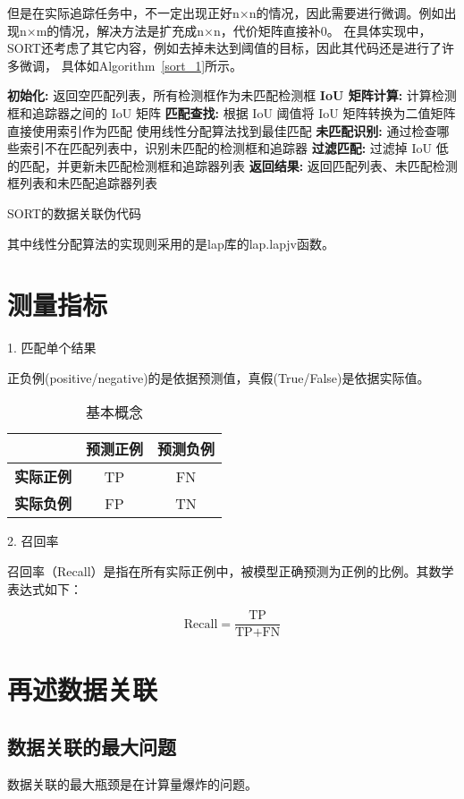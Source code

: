 但是在实际追踪任务中，不一定出现正好n×n的情况，因此需要进行微调。例如出现n×m的情况，解决方法是扩充成n×n，代价矩阵直接补0。
在具体实现中，SORT还考虑了其它内容，例如去掉未达到阈值的目标，因此其代码还是进行了许多微调，
具体如Algorithm\ \ref{sort_1}所示。

\begin{algorithm}
	\begin{algorithmic}
		\State \textbf{初始化:}
		\State 返回空匹配列表，所有检测框作为未匹配检测框
		\EndIf
		\State \textbf{IoU 矩阵计算:}
		\State 计算检测框和追踪器之间的 IoU 矩阵
		\State \textbf{匹配查找:}
		\State 根据 IoU 阈值将 IoU 矩阵转换为二值矩阵
		\State 直接使用索引作为匹配
		\Else
		\State 使用线性分配算法找到最佳匹配
		\EndIf
		\State \textbf{未匹配识别:}
		\State 通过检查哪些索引不在匹配列表中，识别未匹配的检测框和追踪器
		\State \textbf{过滤匹配:}
		\State 过滤掉 IoU 低的匹配，并更新未匹配检测框和追踪器列表
		\State \textbf{返回结果:}
		\State 返回匹配列表、未匹配检测框列表和未匹配追踪器列表
	\end{algorithmic}
	\caption{SORT的数据关联伪代码}
	\label{sort_1}
\end{algorithm}

其中线性分配算法的实现则采用的是lap库的lap.lapjv函数。

\chapter{测量指标}
1. 匹配单个结果

正负例(positive/negative)的是依据预测值，真假(True/False)是依据实际值。

\begin{table}[h!]
	\centering
	\caption{基本概念}
	\label{tab:confusion_matrix}
	\begin{tabular}{l c c}
		\toprule
		& \textbf{预测正例} & \textbf{预测负例} \\
		\midrule
		\textbf{实际正例} & TP & FN \\
		\textbf{实际负例} & FP & TN \\
		\bottomrule
	\end{tabular}
\end{table}

2. 召回率

召回率（Recall）是指在所有实际正例中，被模型正确预测为正例的比例。其数学表达式如下：

\[
\text{Recall} = \frac{\text{TP}}{\text{TP} + \text{FN}}
\]

\chapter{再述数据关联}

\section{数据关联的最大问题}
数据关联的最大瓶颈是在计算量爆炸的问题。



